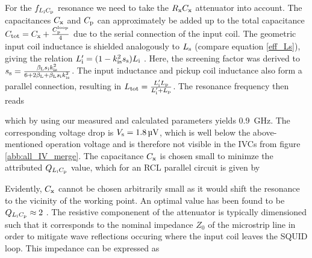 For the $f_{L_{\rm i}C_{\rm p}}$ resonance we need to take the $R_{\rm x}C_{\rm x}$ attenuator into account. The capacitances $C_{\rm x}$ and $C_{\rm p}$ can approximately be added up to the total capacitance $C_{\rm tot}=C_{\rm x}+\frac{C_{\rm p}^{\rm loop}}{4}$ due to the serial connection of the input coil. The geometric input coil inductance is shielded analogously to $L_{\rm s}$ (compare equation \ref{eff_Ls}), giving the relation $L_{\rm i}'=(1-k_{\rm is}^2s_{\rm s})L_{\rm i}$ \cite{Cantor1996}. Here, the screening factor was derived to $s_{\rm s}=\frac{\beta_{\rm L}s_{\rm i}k_{\rm is}^2}{6+2\beta_{\rm L}+\beta_{\rm L}s_{\rm i}k_{\rm is}^2}$. The input inductance and pickup coil inductance also form a parallel connection, resulting in $L_{\rm tot}=\frac{L_{\rm i}'L_{\rm p}}{L_{\rm i}'+L_{\rm p}}$. The resonance frequency then reads 


which by using our measured and calculated parameters yields \qty{0.9}{\GHz}. The corresponding voltage drop is $V_{\rm s}=\qty{1.8}{\uV}$, which is well below the above-mentioned operation voltage and is therefore not visible in the IVCs from figure \ref{abb:all_IV_merge}. The capacitance $C_{\rm x}$ is chosen small to minimze the attributed $Q_{L_{\rm i}C_{\rm p}}$ value, which for an RCL parallel circuit is given by 



Evidently, $C_{\rm x}$ cannot be chosen arbitrarily small as it would shift the resonance to the vicinity of the working point. An optimal value has been found to be $Q_{L_{\rm i}C_{\rm p}}\approx 2$ \cite{Cantor1996}. The resistive componenent of the attenuator is typically dimensioned such that it corresponds to the nominal impedance $Z_0$ of the microstrip line in order to mitigate wave reflections occuring where the input coil leaves the SQUID loop. This impedance can be expressed as \cite{EnpukuI1991} 


